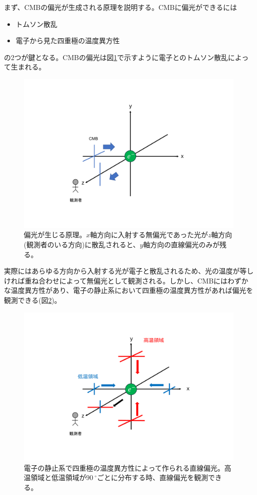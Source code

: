 まず、CMBの偏光が生成される原理を説明する。CMBに偏光ができるには
\begin{itemize}
  \item トムソン散乱
  \item 電子から見た四重極の温度異方性
\end{itemize}
の2つが鍵となる\cite{komatsu}。CMBの偏光は図\ref{cmb_tom}で示すように電子とのトムソン散乱によって生まれる。
\begin{figure}[htbp]
  \centering
  \includegraphics[width=0.8\columnwidth]{2_cosmology/figs/pol_1.pdf}
  \caption{偏光が生じる原理。$x$軸方向に入射する無偏光であった光が$z$軸方向(観測者のいる方向)に散乱されると、$y$軸方向の直線偏光のみが残る。}
  \label{cmb_tom}
\end{figure}
実際にはあらゆる方向から入射する光が電子と散乱されるため、光の温度が等しければ重ね合わせによって無偏光として観測される。しかし、CMBにはわずかな温度異方性があり、電子の静止系において四重極の温度異方性があれば偏光を観測できる(図\ref{four_pol})。
\begin{figure}[htbp]
  \centering
  \includegraphics[width=0.8\columnwidth]{2_cosmology/figs/pol_2.pdf}
  \caption{電子の静止系で四重極の温度異方性によって作られる直線偏光。高温領域と低温領域が$\SI{90}{^{\circ}}$ごとに分布する時、直線偏光を観測できる。}
  \label{four_pol}
\end{figure}

